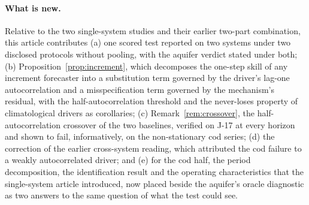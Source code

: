 \paragraph{What is new.} Relative to the two single-system studies and their earlier two-part combination, this article contributes (a) one scored test reported on two systems under two disclosed protocols without pooling, with the aquifer verdict stated under both; (b) Proposition~\ref{prop:increment}, which decomposes the one-step skill of any increment forecaster into a substitution term governed by the driver's lag-one autocorrelation and a misspecification term governed by the mechanism's residual, with the half-autocorrelation threshold and the never-loses property of climatological drivers as corollaries; (c) Remark~\ref{rem:crossover}, the half-autocorrelation crossover of the two baselines, verified on J-17 at every horizon and shown to fail, informatively, on the non-stationary cod series; (d) the correction of the earlier cross-system reading, which attributed the cod failure to a weakly autocorrelated driver; and (e) for the cod half, the period decomposition, the identification result and the operating characteristics that the single-system article introduced, now placed beside the aquifer's oracle diagnostic as two answers to the same question of what the test could see.
